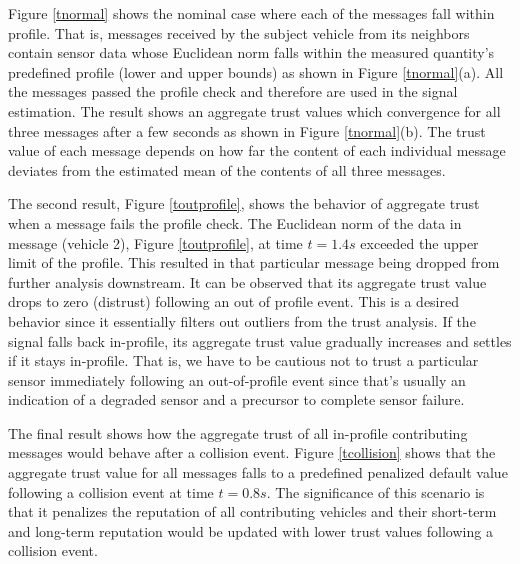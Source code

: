 \documentclass[conference]{IEEEtran}
\begin{document}
Figure \ref{tnormal} shows the nominal case where each of the messages
fall within profile. That is, messages received by the subject
vehicle from its neighbors contain sensor data whose Euclidean 
norm falls within the measured quantity's predefined profile (lower and upper bounds) as 
shown in Figure \ref{tnormal}(a). All the messages passed the profile
check and therefore are used in the signal estimation. The result shows
an aggregate trust values which convergence for all three
messages after a few seconds as shown in Figure \ref{tnormal}(b). The trust value of each message depends 
on how far the content of each individual message deviates from the estimated mean of the contents of all three messages.


The second result, Figure \ref{toutprofile}, shows the behavior of aggregate trust when a message 
fails the profile check. The Euclidean norm of the data in message (vehicle 2), Figure \ref{toutprofile},
at time $t=1.4s$ exceeded the upper limit of the profile. This resulted in that particular message being dropped from further analysis downstream. It can be observed that its aggregate trust value drops to zero (distrust)
following an out of profile event. This is a desired behavior since it essentially filters out outliers from
the trust analysis. If the signal falls back in-profile, its aggregate trust value gradually increases
and settles if it stays in-profile. That is, we have to be cautious not to trust a particular sensor 
immediately following an out-of-profile event since that's usually an indication of a degraded sensor and
a precursor to complete sensor failure.


The final result shows how the aggregate trust of all in-profile contributing messages would behave after a collision event. Figure \ref{tcollision} shows that the aggregate trust value for all messages falls to a predefined penalized default value following a collision event at time $t=0.8s$. The significance of this scenario is that it penalizes the reputation of all contributing vehicles and their short-term and long-term reputation would be updated with lower trust values following a collision event.
\end{document}
